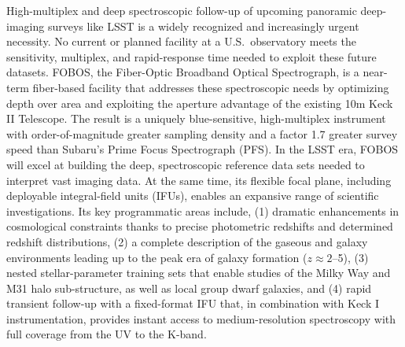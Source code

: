 \documentclass[oneside,12pt]{amsart}
\begin{document}
High-multiplex and deep spectroscopic follow-up of upcoming panoramic
deep-imaging surveys like LSST is a widely recognized and
increasingly urgent necessity. No current or planned facility at a
U.S.~observatory meets the sensitivity, multiplex, and rapid-response
time needed to exploit these future datasets. FOBOS, the Fiber-Optic
Broadband Optical Spectrograph, is a near-term fiber-based facility
that addresses these spectroscopic needs by optimizing depth over
area and exploiting the aperture advantage of the existing 10m Keck
II Telescope. The result is a uniquely blue-sensitive, high-multiplex
instrument with order-of-magnitude greater sampling density and a
factor 1.7 greater survey speed than Subaru's Prime Focus
Spectrograph (PFS). In the LSST era, FOBOS will excel at building the
deep, spectroscopic reference data sets needed to interpret vast
imaging data. At the same time, its flexible focal plane, including
deployable integral-field units (IFUs), enables an expansive range of
scientific investigations. Its key programmatic areas include, (1)
dramatic enhancements in cosmological constraints thanks to precise
photometric redshifts and determined redshift distributions, (2) a
complete description of the gaseous and galaxy environments leading
up to the peak era of galaxy formation ($z \approx 2$--5), (3) nested
stellar-parameter training sets that enable studies of the Milky Way
and M31 halo sub-structure, as well as local group dwarf galaxies,
and (4) rapid transient follow-up with a fixed-format IFU that, in
combination with Keck I instrumentation, provides instant access to
medium-resolution spectroscopy with full coverage from the UV to the
K-band.

\pagebreak















\clearpage
\begin{multicols}{2}
\scriptsize


\end{multicols}

\end{document}
